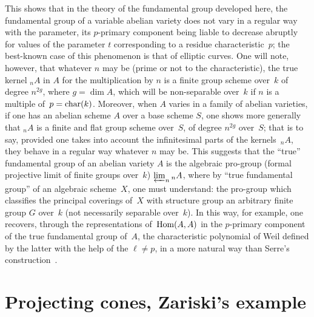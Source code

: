 This shows that in the theory of the fundamental group
developed here, the fundamental group of a variable abelian
variety does not vary in a regular way
with the parameter, its $p$-primary component being liable to decrease
abruptly for values of the parameter $t$ corresponding to
a residue characteristic~$p$; the best-known case of
this phenomenon is that of elliptic curves. One will note,
however, that whatever $n$ may be (prime or not to the
characteristic), the true kernel ${}_nA$ in $A$ for the
multiplication by $n$ is a finite group scheme over~$k$ of
degree $n^{2g}$, where $g=\dim A$, which will be non-separable over~$k$ if $n$ is a multiple of~$p=\operatorname{char}(k)$. Moreover, when $A$
varies in a family of abelian varieties, \ie if one
has an abelian scheme $A$ over a base scheme $S$, one
shows more generally that ${}_n A$ is a finite and flat group
scheme over~$S$, of degree $n^{2g}$ over~$S$;
that is to say, provided one takes into account the infinitesimal
parts of the kernels~${}_n A$, they behave in a regular way
whatever $n$ may be. This suggests that the
``true'' fundamental group of an abelian variety $A$
is the algebraic pro-group (formal projective limit of
finite groups over~$k$) $\varprojlim_n{{}_nA}$, where
by ``true fundamental group'' of an algebraic scheme~$X$, one
must understand: the pro-group which classifies the principal
coverings of~$X$ with structure group an arbitrary finite group $G$
over~$k$ (not necessarily separable over~$k$). In this
way, for example, one recovers, through the
representations of~$\operatorname{Hom}(A,A)$ in the $p$-primary component of the
true fundamental group of~$A$, the characteristic polynomial of
Weil defined by the latter with the help of the $\ell\neq p$, in a more natural way than Serre's construction~\cite{XI.8}.

\section{Projecting cones, Zariski's example}
\label{XI.3}

